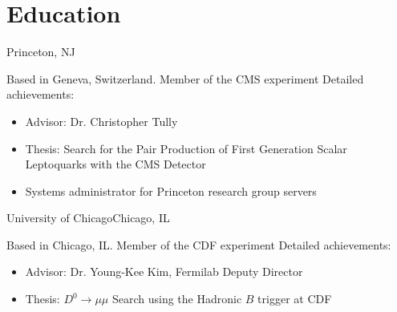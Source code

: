\section{Education}

 {Princeton, NJ}{}{Based in Geneva, Switzerland.  Member of the CMS experiment \newline{}%
  Detailed achievements:
  \begin{itemize}
  \item Advisor: Dr. Christopher Tully
  \item Thesis: Search for the Pair Production of First Generation Scalar Leptoquarks with the CMS Detector
  \item Systems administrator for Princeton research group servers
  \end{itemize}
}

 {University of Chicago}{Chicago, IL}{}{Based in Chicago, IL.  Member of the CDF experiment \newline{}%
  Detailed achievements:
  \begin{itemize}
  \item Advisor: Dr. Young-Kee Kim, Fermilab Deputy Director
  \item Thesis: $D^0\rightarrow\mu\mu$ Search using the Hadronic $B$ trigger at CDF
  \end{itemize}
}
